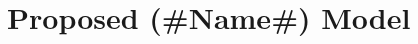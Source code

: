 \documentclass[../Report.tex]{subfiles}
\begin{document}
\chapter{Proposed (\#Name\#) Model}
\end{document}
